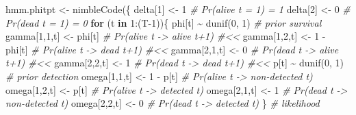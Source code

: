 \documentclass[
  12pt,
]{krantz}
\newenvironment{Shaded}{\begin{snugshade}}{\end{snugshade}}
\newcommand{\CommentTok}[1]{\textcolor[rgb]{0.56,0.35,0.01}{\textit{#1}}}
\newcommand{\ControlFlowTok}[1]{\textcolor[rgb]{0.13,0.29,0.53}{\textbf{#1}}}
\newcommand{\DecValTok}[1]{\textcolor[rgb]{0.00,0.00,0.81}{#1}}
\newcommand{\FunctionTok}[1]{\textcolor[rgb]{0.00,0.00,0.00}{#1}}
\newcommand{\NormalTok}[1]{#1}
\newcommand{\OtherTok}[1]{\textcolor[rgb]{0.56,0.35,0.01}{#1}}
\newcommand{\SpecialCharTok}[1]{\textcolor[rgb]{0.00,0.00,0.00}{#1}}
\begin{document}
\begin{Shaded}
\begin{Highlighting}[]
\NormalTok{hmm.phitpt }\OtherTok{\textless{}{-}} \FunctionTok{nimbleCode}\NormalTok{(\{}
\NormalTok{  delta[}\DecValTok{1}\NormalTok{] }\OtherTok{\textless{}{-}} \DecValTok{1}          \CommentTok{\# Pr(alive t = 1) = 1}
\NormalTok{  delta[}\DecValTok{2}\NormalTok{] }\OtherTok{\textless{}{-}} \DecValTok{0}          \CommentTok{\# Pr(dead t = 1) = 0}
  \ControlFlowTok{for}\NormalTok{ (t }\ControlFlowTok{in} \DecValTok{1}\SpecialCharTok{:}\NormalTok{(T}\DecValTok{{-}1}\NormalTok{))\{}
\NormalTok{    phi[t] }\SpecialCharTok{\textasciitilde{}} \FunctionTok{dunif}\NormalTok{(}\DecValTok{0}\NormalTok{, }\DecValTok{1}\NormalTok{) }\CommentTok{\# prior survival}
\NormalTok{    gamma[}\DecValTok{1}\NormalTok{,}\DecValTok{1}\NormalTok{,t] }\OtherTok{\textless{}{-}}\NormalTok{ phi[t]      }\CommentTok{\# Pr(alive t {-}\textgreater{} alive t+1) \#\textless{}\textless{}}
\NormalTok{    gamma[}\DecValTok{1}\NormalTok{,}\DecValTok{2}\NormalTok{,t] }\OtherTok{\textless{}{-}} \DecValTok{1} \SpecialCharTok{{-}}\NormalTok{ phi[t]  }\CommentTok{\# Pr(alive t {-}\textgreater{} dead t+1) \#\textless{}\textless{}}
\NormalTok{    gamma[}\DecValTok{2}\NormalTok{,}\DecValTok{1}\NormalTok{,t] }\OtherTok{\textless{}{-}} \DecValTok{0}        \CommentTok{\# Pr(dead t {-}\textgreater{} alive t+1) \#\textless{}\textless{}}
\NormalTok{    gamma[}\DecValTok{2}\NormalTok{,}\DecValTok{2}\NormalTok{,t] }\OtherTok{\textless{}{-}} \DecValTok{1}        \CommentTok{\# Pr(dead t {-}\textgreater{} dead t+1) \#\textless{}\textless{}}
\NormalTok{    p[t] }\SpecialCharTok{\textasciitilde{}} \FunctionTok{dunif}\NormalTok{(}\DecValTok{0}\NormalTok{, }\DecValTok{1}\NormalTok{) }\CommentTok{\# prior detection}
\NormalTok{    omega[}\DecValTok{1}\NormalTok{,}\DecValTok{1}\NormalTok{,t] }\OtherTok{\textless{}{-}} \DecValTok{1} \SpecialCharTok{{-}}\NormalTok{ p[t]    }\CommentTok{\# Pr(alive t {-}\textgreater{} non{-}detected t)}
\NormalTok{    omega[}\DecValTok{1}\NormalTok{,}\DecValTok{2}\NormalTok{,t] }\OtherTok{\textless{}{-}}\NormalTok{ p[t]        }\CommentTok{\# Pr(alive t {-}\textgreater{} detected t)}
\NormalTok{    omega[}\DecValTok{2}\NormalTok{,}\DecValTok{1}\NormalTok{,t] }\OtherTok{\textless{}{-}} \DecValTok{1}        \CommentTok{\# Pr(dead t {-}\textgreater{} non{-}detected t)}
\NormalTok{    omega[}\DecValTok{2}\NormalTok{,}\DecValTok{2}\NormalTok{,t] }\OtherTok{\textless{}{-}} \DecValTok{0}        \CommentTok{\# Pr(dead t {-}\textgreater{} detected t)}
\NormalTok{  \}}
  \CommentTok{\# likelihood}

\end{Highlighting}
\end{Shaded}
\end{document}
